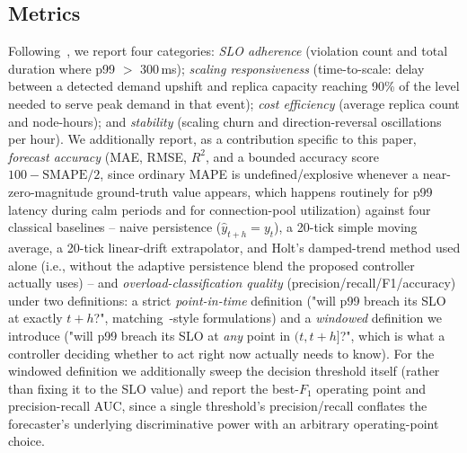\documentclass[conference]{IEEEtran}
\begin{document}
\subsection{Metrics}
Following~\cite{ref_base}, we report four categories: \emph{SLO adherence} (violation count and total
duration where p99 $>$ 300\,ms); \emph{scaling responsiveness} (time-to-scale: delay between a detected
demand upshift and replica capacity reaching 90\% of the level needed to serve peak demand in that
event); \emph{cost efficiency} (average replica count and node-hours); and \emph{stability} (scaling
churn and direction-reversal oscillations per hour). We additionally report, as a contribution specific
to this paper, \emph{forecast accuracy} (MAE, RMSE, $R^2$, and a bounded accuracy score
$100 - \mathrm{SMAPE}/2$, since ordinary MAPE is undefined/explosive whenever a near-zero-magnitude
ground-truth value appears, which happens routinely for p99 latency during calm periods and for
connection-pool utilization) against four classical baselines -- naive persistence
($\hat y_{t+h}=y_t$), a 20-tick simple moving average, a 20-tick linear-drift extrapolator, and Holt's
damped-trend method used alone (i.e., without the adaptive persistence blend the proposed controller
actually uses) -- and \emph{overload-classification quality} (precision/recall/F1/accuracy) under two
definitions: a strict \emph{point-in-time} definition ("will p99 breach its SLO at exactly $t+h$?",
matching~\cite{ref_base}-style formulations) and a \emph{windowed} definition we introduce
("will p99 breach its SLO at \emph{any} point in $(t, t+h]$?", which is what a controller deciding
whether to act right now actually needs to know). For the windowed definition we additionally sweep the
decision threshold itself (rather than fixing it to the SLO value) and report the best-$F_1$ operating
point and precision-recall AUC, since a single threshold's precision/recall conflates the forecaster's
underlying discriminative power with an arbitrary operating-point choice.
\end{document}
